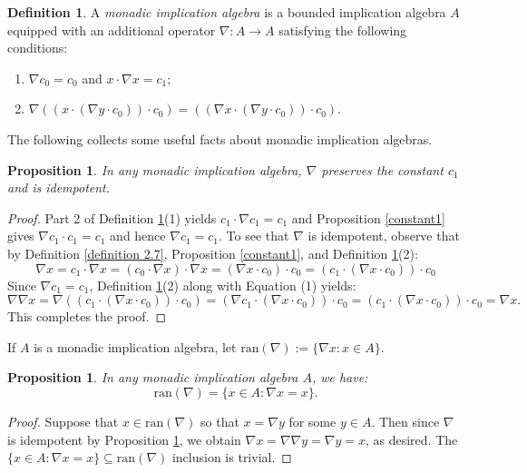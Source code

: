 \documentclass[reqno]{amsart}
\theoremstyle{plain}
\newtheorem{proposition}[theorem]{Proposition}
\theoremstyle{definition}
\newtheorem{definition}[theorem]{Definition}
\begin{document}
\begin{definition}\label{mbia}
    A \emph{monadic implication algebra} is a bounded implication algebra $A$ equipped with an additional operator $\nabla\colon A\to A$ satisfying the following conditions: 
    \begin{enumerate} 
        \item $\nabla c_0=c_0$ and $x\cdot\nabla x=c_1$;
        \item $\nabla((x\cdot(\nabla y\cdot c_0))\cdot c_0)=((\nabla x\cdot(\nabla y\cdot c_0))\cdot c_0)$. 
    \end{enumerate}
\end{definition}
The following  collects some useful facts about monadic implication algebras. 
\begin{proposition}\label{idempotent}
    In any monadic implication algebra, $\nabla$ preserves the constant $c_1$ and is idempotent.  
\end{proposition}
\begin{proof}
    Part 2 of Definition \ref{mbia}(1) yields $c_1\cdot \nabla c_1=c_1$ and Proposition \ref{constant1} gives $\nabla c_1\cdot c_1=c_1$ and hence $\nabla c_1=c_1$. To see that $\nabla$ is idempotent, observe that by Definition \ref{definition 2.7}, Proposition \ref{constant1}, and Definition \ref{mbia}(2): 
\begin{equation}
    \nabla x=c_1\cdot \nabla x=(c_0\cdot \nabla x)\cdot \nabla x=(\nabla x\cdot c_0)\cdot c_0=(c_1\cdot(\nabla x\cdot c_0))\cdot c_0
\end{equation}
    Since $\nabla c_1=c_1$, Definition \ref{mbia}(2) along with Equation (1) yields: \[\nabla\nabla x=\nabla((c_1\cdot(\nabla x\cdot c_0))\cdot c_0)=(\nabla c_1\cdot(\nabla x\cdot c_0))\cdot c_0=(c_1\cdot(\nabla x\cdot c_0))\cdot c_0=\nabla x.\] This completes the proof. 
\end{proof}
If $A$ is a monadic implication algebra, let $\text{ran}(\nabla):=\{\nabla x:x\in A\}$. 
\begin{proposition}\label{prop 3.7}
    In any monadic implication algebra $A$, we have: \[\text{ran}(\nabla)=\{x\in A:\nabla x=x\}.\] 
\end{proposition}
\begin{proof}
    Suppose that $x\in\text{ran}(\nabla)$ so that $x=\nabla y$ for some $y\in A$. Then since $\nabla$ is idempotent by Proposition \ref{idempotent}, we obtain $\nabla x=\nabla\nabla y=\nabla y=x$, as desired. The $\{x\in A:\nabla x=x\}\subseteq\text{ran}(\nabla)$ inclusion is trivial.   
\end{proof}
\end{document}
